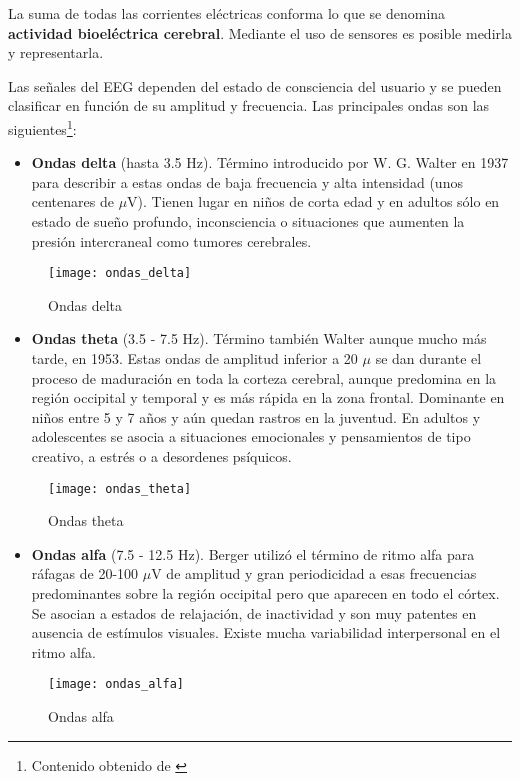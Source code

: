 La suma de todas las corrientes eléctricas conforma lo que se denomina \textbf{actividad bioeléctrica cerebral}. Mediante el uso de sensores es posible medirla y representarla.

Las señales del \acrshort{EEG} dependen del estado de consciencia del usuario y se pueden clasificar en función de su amplitud y frecuencia. Las principales ondas son las siguientes\footnote{Contenido obtenido de \cite{apuntes}}:

\begin{itemize}
\item\textbf{Ondas delta} (hasta 3.5 Hz). Término introducido por W. G. Walter en 1937 para describir a estas ondas de baja frecuencia y alta intensidad (unos centenares de $\mu$V). Tienen lugar en niños de corta edad y en adultos sólo en estado de sueño profundo, inconsciencia o situaciones que aumenten la presión intercraneal como tumores cerebrales.
\end{itemize}
\begin{figure} [H]
    \centering
    \texttt{[image: ondas\_delta]}
    \caption{Ondas delta \cite{apuntes}}
    \label{fig:ondas_delta}
\end{figure}

\clearpage

\begin{itemize}
\item\textbf{Ondas theta} (3.5 - 7.5 Hz). Término también Walter aunque mucho más tarde, en 1953. Estas ondas de amplitud inferior a 20 $\mu$ se dan durante el proceso de maduración en toda la corteza cerebral, aunque predomina en la región occipital y temporal y es más rápida en la zona frontal. Dominante en niños entre 5 y 7 años y aún quedan rastros en la juventud. En adultos y adolescentes se asocia a situaciones emocionales y pensamientos de tipo creativo, a estrés o a desordenes psíquicos.
\end{itemize}
\begin{figure} [H]
    \centering
    \texttt{[image: ondas\_theta]}
    \caption{Ondas theta \cite{apuntes}}
    \label{fig:ondas_theta}
\end{figure}

\begin{itemize}
\item\textbf{Ondas alfa} (7.5 - 12.5 Hz). Berger utilizó el término de ritmo alfa para ráfagas de 20-100 $\mu$V de amplitud y gran periodicidad a esas frecuencias predominantes sobre la región occipital pero que aparecen en todo el córtex. Se asocian a estados de relajación, de inactividad y son muy patentes en ausencia de estímulos visuales. Existe mucha variabilidad interpersonal en el ritmo alfa.
\end{itemize}
\begin{figure} [H]
    \centering
    \texttt{[image: ondas\_alfa]}
    \caption{Ondas alfa \cite{apuntes}}
    \label{fig:ondas_alfa}
\end{figure}

